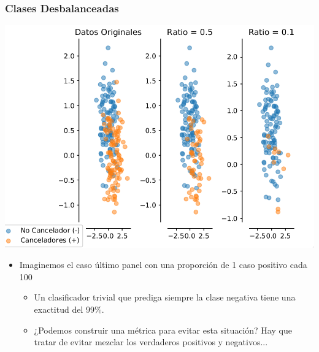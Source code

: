 \documentclass[leqno, 10pt, envcountsect]{beamer}
\numberwithin{equation}{section}
\theoremstyle{definition}
\theoremstyle{example}
\numberwithin{figure}{section}
\numberwithin{table}{section}
\let\olditem\item
\renewcommand{\item}{%
\olditem\vspace{1pt}}
\begin{document}
\begin{frame}
  \frametitle{Clases Desbalanceadas}
  \begin{center}
    \includegraphics[scale=0.2]{unbalance_class.png}
  \end{center}
  \begin{itemize}
    \item Imaginemos el caso último panel con una proporción de 1 caso
      positivo cada 100
      \begin{itemize}
        \item Un clasificador trivial que prediga siempre la clase negativa
          tiene una exactitud del 99\%.
        \item ¿Podemos construir una métrica para evitar esta situación? Hay
          que tratar de evitar mezclar los verdaderos positivos y negativos...
      \end{itemize}
  \end{itemize}
\end{frame}
\end{document}
